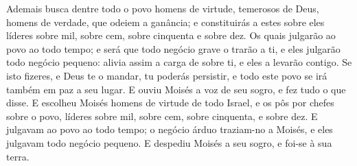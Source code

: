 {{  Ademais busca dentre todo o povo homens de virtude, temerosos de Deus, homens de verdade, que odeiem a ganância; e constituirás a estes sobre eles líderes sobre mil, sobre cem, sobre cinquenta e sobre dez.
  Os quais julgarão ao povo ao todo tempo; e será que todo negócio grave o trarão a ti, e eles julgarão todo negócio pequeno: alivia assim a carga de sobre ti, e eles a levarão contigo.
  Se isto fizeres, e Deus te o mandar, tu poderás persistir, e todo este povo se irá também em paz a seu lugar}.
  E ouviu Moisés a voz de seu sogro, e fez tudo o que disse.
  E escolheu Moisés homens de virtude de todo Israel, e os pôs por chefes sobre o povo, líderes sobre mil, sobre cem, sobre cinquenta, e sobre dez.
  E julgavam ao povo ao todo tempo; o negócio árduo traziam-no a Moisés, e eles julgavam todo negócio pequeno.
  E despediu Moisés a seu sogro, e foi-se à sua terra.
\par }

